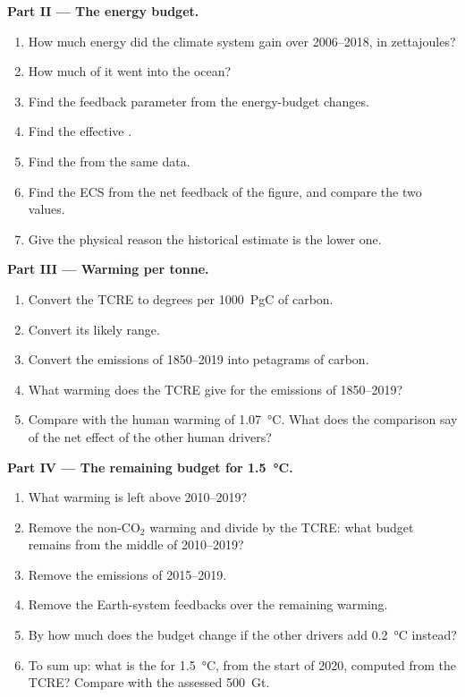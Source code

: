 \begin{problem}
\noindent\textbf{Part II --- The energy budget.}
\begin{enumerate}[resume]
  \item How much energy did the climate system gain over 2006--2018, in zettajoules?
  \item How much of it went into the ocean?
  \item Find the feedback parameter from the energy-budget changes.
  \item Find the effective .
  \item Find the  from the same data.
  \item Find the ECS from the net feedback of the figure, and compare the two values.
  \item Give the physical reason the historical estimate is the lower one.
\end{enumerate}

\noindent\textbf{Part III --- Warming per tonne.}
\begin{enumerate}[resume]
  \item Convert the TCRE to degrees per \qty{1000}{PgC} of carbon.
  \item Convert its likely range.
  \item Convert the emissions of 1850--2019 into petagrams of carbon.
  \item What warming does the TCRE give for the emissions of 1850--2019?
  \item Compare with the human warming of \qty{1.07}{\celsius}. What does the comparison say of the
        net effect of the other human drivers?
\end{enumerate}

\noindent\textbf{Part IV --- The remaining budget for \qty{1.5}{\celsius}.}
\begin{enumerate}[resume]
  \item What warming is left above 2010--2019?
  \item Remove the non-CO$_2$ warming and divide by the TCRE: what budget remains from the middle
        of 2010--2019?
  \item Remove the emissions of 2015--2019.
  \item Remove the Earth-system feedbacks over the remaining warming.
  \item By how much does the budget change if the other drivers add \qty{0.2}{\celsius} instead?
  \item To sum up: what is the  for \qty{1.5}{\celsius}, from the start of
        2020, computed from the TCRE? Compare with the assessed \qty{500}{Gt}.
\end{enumerate}
\end{problem}
